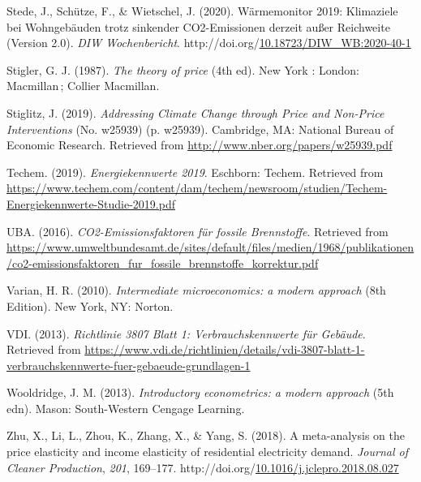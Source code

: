 \documentclass[12pt,twoside]{reedthesis}
\newlength{\cslhangindent}
\newenvironment{CSLReferences}[2] %
 {%
  \setlength{\parindent}{0pt}
  \ifodd #1 \everypar{\setlength{\hangindent}{\cslhangindent}}\ignorespaces\fi
  \ifnum #2 > 0
  \setlength{\parskip}{#2\baselineskip}
  \fi
 }%
 {}
\begin{document}
\begin{CSLReferences}{1}{0}
\leavevmode{}%
Stede, J., Schütze, F., \& Wietschel, J. (2020). Wärmemonitor 2019: Klimaziele bei Wohngebäuden trotz sinkender CO2-Emissionen derzeit außer Reichweite (Version 2.0). \emph{DIW Wochenbericht}. http://doi.org/\href{https://doi.org/10.18723/DIW_WB:2020-40-1}{10.18723/DIW\_WB:2020-40-1}

\leavevmode{}%
Stigler, G. J. (1987). \emph{The theory of price} (4th ed). New York : London: Macmillan\,; Collier Macmillan.

\leavevmode{}%
Stiglitz, J. (2019). \emph{Addressing Climate Change through Price and Non-Price Interventions} (No. w25939) (p. w25939). Cambridge, MA: National Bureau of Economic Research. Retrieved from \url{http://www.nber.org/papers/w25939.pdf}

\leavevmode{}%
Techem. (2019). \emph{Energiekennwerte 2019}. Eschborn: Techem. Retrieved from \url{https://www.techem.com/content/dam/techem/newsroom/studien/Techem-Energiekennwerte-Studie-2019.pdf}

\leavevmode{}%
UBA. (2016). \emph{CO2-Emissionsfaktoren für fossile Brennstoffe}. Retrieved from \url{https://www.umweltbundesamt.de/sites/default/files/medien/1968/publikationen/co2-emissionsfaktoren_fur_fossile_brennstoffe_korrektur.pdf}

\leavevmode{}%
Varian, H. R. (2010). \emph{Intermediate microeconomics: a modern approach} (8th Edition). New York, NY: Norton.

\leavevmode{}%
VDI. (2013). \emph{Richtlinie 3807 Blatt 1: Verbrauchskennwerte für Gebäude}. Retrieved from \url{https://www.vdi.de/richtlinien/details/vdi-3807-blatt-1-verbrauchskennwerte-fuer-gebaeude-grundlagen-1}

\leavevmode{}%
Wooldridge, J. M. (2013). \emph{Introductory econometrics: a modern approach} (5th edn). Mason: South-Western Cengage Learning.

\leavevmode{}%
Zhu, X., Li, L., Zhou, K., Zhang, X., \& Yang, S. (2018). A meta-analysis on the price elasticity and income elasticity of residential electricity demand. \emph{Journal of Cleaner Production}, \emph{201}, 169--177. http://doi.org/\href{https://doi.org/10.1016/j.jclepro.2018.08.027}{10.1016/j.jclepro.2018.08.027}

\end{CSLReferences}

\end{document}
